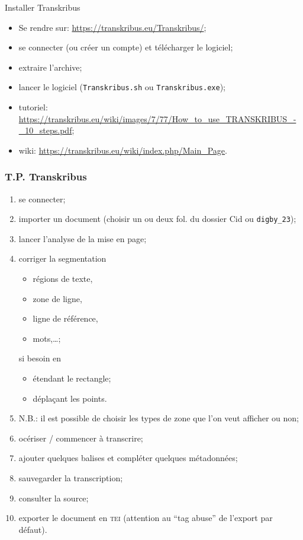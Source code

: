 \documentclass[ignorenonframetext]{beamer}
\begin{document}
\begin{frame}{Installer Transkribus}

\begin{itemize}
\item Se rendre sur: \url{https://transkribus.eu/Transkribus/};
\item se connecter (ou créer un compte) et télécharger le logiciel;
\item extraire l'archive;
\item lancer le logiciel (\texttt{Transkribus.sh} ou \texttt{Transkribus.exe});
\item tutoriel: \url{https://transkribus.eu/wiki/images/7/77/How_to_use_TRANSKRIBUS_-_10_steps.pdf};
\item wiki: \url{https://transkribus.eu/wiki/index.php/Main_Page}.
\end{itemize}


\end{frame}

\begin{frame}[shrink]
\frametitle{T.P. Transkribus}

\begin{enumerate}
\item se connecter;
\item importer un document (choisir un ou deux fol. du dossier Cid ou \texttt{digby\_23});
\item lancer l'analyse de la mise en page;
\item corriger la segmentation
\begin{itemize}
\item régions de texte, 
\item zone de ligne, 
\item ligne de référence, 
\item mots,…;
\end{itemize}
si besoin en
\begin{itemize}
\item étendant le rectangle;
\item déplaçant les points.
\end{itemize}
\item[] N.B.: il est possible de choisir les types de zone que l'on veut afficher ou non;
\item océriser / commencer à transcrire;
\item ajouter quelques balises et compléter quelques métadonnées;
\item sauvegarder la transcription;
\item consulter la source;
\item exporter le document en \textsc{tei} (attention au ``tag abuse'' de l'export par défaut).
\end{enumerate}

\end{frame}
\end{document}
